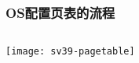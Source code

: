 \begin{frame} 
	\frametitle{OS配置页表的流程}
	
	\begin{columns}
		
		\begin{column}{1.\textwidth}
			\centering
			\texttt{[image: sv39-pagetable]}
			
		\end{column}
		
		
		\begin{column}{.1\textwidth}
			
			
		\end{column}
		
		
	\end{columns}
\end{frame}


